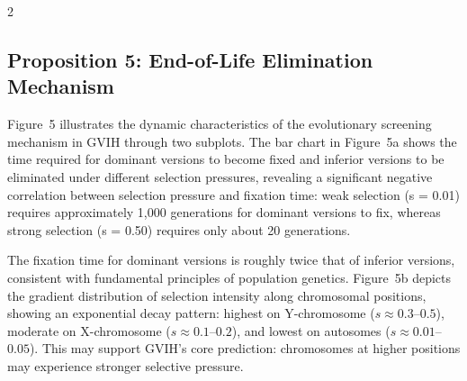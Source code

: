 \documentclass{base}
\begin{document}
\begin{multicols}{2}



\subsection{Proposition 5: End-of-Life Elimination Mechanism}
Figure~5 illustrates the dynamic characteristics of the evolutionary screening mechanism in GVIH through two subplots. The bar chart in Figure~5a shows the time required for dominant versions to become fixed and inferior versions to be eliminated under different selection pressures, revealing a significant negative correlation between selection pressure and fixation time: weak selection (s = 0.01) requires approximately 1,000 generations for dominant versions to fix, whereas strong selection (s = 0.50) requires only about 20 generations. 


The fixation time for dominant versions is roughly twice that of inferior versions, consistent with fundamental principles of population genetics. Figure~5b depicts the gradient distribution of selection intensity along chromosomal positions, showing an exponential decay pattern: highest on Y-chromosome ($s \approx 0.3$--$0.5$), moderate on X-chromosome ($s \approx 0.1$--$0.2$), and lowest on autosomes ($s \approx 0.01$--$0.05$). This may support GVIH's core prediction: chromosomes at higher positions may experience stronger selective pressure.


\end{multicols}
\end{document}
